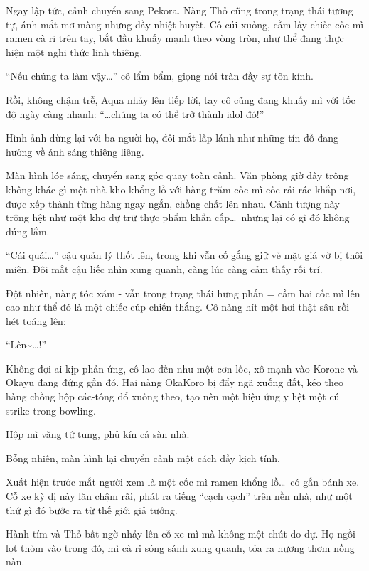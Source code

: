 \documentclass[../main.tex]{subfiles}
\begin{document}
Ngay lập tức, cảnh chuyển sang Pekora. Nàng Thỏ cũng trong trạng thái tương tự, ánh mắt mơ màng nhưng đầy nhiệt huyết. Cô cúi xuống, cầm lấy chiếc cốc mì ramen cà ri trên tay, bắt đầu khuấy mạnh theo vòng tròn, như thể đang thực hiện một nghi thức linh thiêng.

``Nếu chúng ta làm vậy\dots'' cô lẩm bẩm, giọng nói tràn đầy sự tôn kính.

Rồi, không chậm trễ, Aqua nhảy lên tiếp lời, tay cô cũng đang khuấy mì với tốc độ ngày càng nhanh: ``\dots chúng ta có thể trở thành idol đó!''

Hình ảnh dừng lại với ba người họ, đôi mắt lấp lánh như những tín đồ đang hướng về ánh sáng thiêng liêng.

\ct


Màn hình lóe sáng, chuyển sang góc quay toàn cảnh. Văn phòng giờ đây trông không khác gì một nhà kho khổng lồ với hàng trăm cốc mì cốc rải rác khắp nơi, được xếp thành từng hàng ngay ngắn, chồng chất lên nhau. Cảnh tượng này trông hệt như một kho dự trữ thực phẩm khẩn cấp\dots\ nhưng lại có gì đó không đúng lắm.

``Cái quái\dots'' cậu quản lý thốt lên, trong khi vẫn cố gắng giữ vẻ mặt giả vờ bị thôi miên. Đôi mắt cậu liếc nhìn xung quanh, càng lúc càng cảm thấy rối trí.

Đột nhiên, nàng tóc xám - vẫn trong trạng thái hưng phấn = cầm hai cốc mì lên cao như thể đó là một chiếc cúp chiến thắng. Cô nàng hít một hơi thật sâu rồi hét toáng lên:

``Lên\~{}\dots!''

Không đợi ai kịp phản ứng, cô lao đến như một cơn lốc, xô mạnh vào Korone và Okayu đang đứng gần đó. Hai nàng OkaKoro bị đẩy ngã xuống đất, kéo theo hàng chồng hộp các-tông đổ xuống theo, tạo nên một hiệu ứng y hệt một cú strike trong bowling.

Hộp mì văng tứ tung, phủ kín cả sàn nhà.

\ct


Bỗng nhiên, màn hình lại chuyển cảnh một cách đầy kịch tính.

Xuất hiện trước mắt người xem là một cốc mì ramen khổng lồ\dots\ có gắn bánh xe. Cỗ xe kỳ dị này lăn chậm rãi, phát ra tiếng ``cạch cạch'' trên nền nhà, như một thứ gì đó bước ra từ thế giới giả tưởng.

Hành tím và Thỏ bất ngờ nhảy lên cỗ xe mì mà không một chút do dự. Họ ngồi lọt thỏm vào trong đó, mì cà ri sóng sánh xung quanh, tỏa ra hương thơm nồng nàn.
\end{document}
